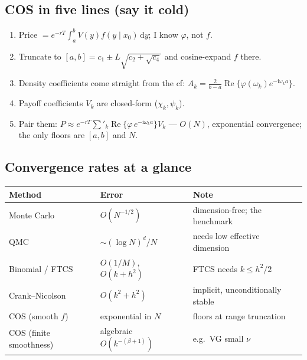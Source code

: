 \documentclass[11pt]{article}
\newcommand{\Real}{\operatorname{Re}}
\newcommand{\ii}{\mathrm{i}}
\newcommand{\dd}{\,\mathrm{d}}
\newcommand{\ch}{\varphi}
\newcommand{\om}{\omega_k}
\begin{document}
\subsection*{COS in five lines (say it cold)}
\begin{enumerate}
  \item Price $=e^{-rT}\!\int_a^b V(y)f(y\mid x_0)\dd y$; I know $\ch$, not $f$.
  \item Truncate to $[a,b]=c_1\pm L\sqrt{c_2+\sqrt{c_4}}$ and cosine-expand $f$ there.
  \item Density coefficients come straight from the cf: $A_k=\tfrac{2}{b-a}\Real\{\ch(\om)e^{-\ii\om a}\}$.
  \item Payoff coefficients $V_k$ are closed-form ($\chi_k,\psi_k$).
  \item Pair them: $P\approx e^{-rT}\sum'_k\Real\{\ch\,e^{-\ii\om a}\}V_k$ --- $O(N)$, exponential
  convergence; the only floors are $[a,b]$ and $N$.
\end{enumerate}

\subsection*{Convergence rates at a glance}
\begin{center}\small
\renewcommand{\arraystretch}{1.2}
\begin{tabular}{l l l}
\toprule
\textbf{Method} & \textbf{Error} & \textbf{Note}\\
\midrule
Monte Carlo & $O(N^{-1/2})$ & dimension-free; the benchmark\\
QMC & $\sim(\log N)^d/N$ & needs low effective dimension\\
Binomial / FTCS & $O(1/M)$, $O(k+h^2)$ & FTCS needs $k\le h^2/2$\\
Crank--Nicolson & $O(k^2+h^2)$ & implicit, unconditionally stable\\
COS (smooth $f$) & exponential in $N$ & floors at range truncation\\
COS (finite smoothness) & algebraic $O(k^{-(\beta+1)})$ & e.g.\ VG small $\nu$\\
\bottomrule
\end{tabular}
\end{center}
\end{document}
